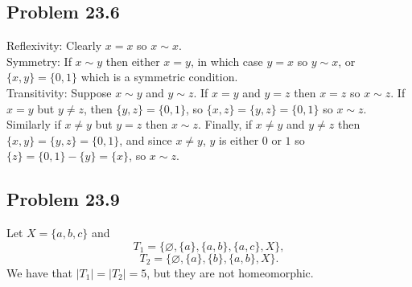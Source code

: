 \documentclass{article}
\newcommand{\nullset}{\varnothing}
\begin{document}
\subsection*{Problem 23.6}
Reflexivity: Clearly $x = x$ so $x \sim x$. \\
Symmetry: If $x \sim y$ then either $x = y$, in which case $y = x$ so $y \sim x$, or $\{x, y\} = \{0, 1\}$ which is a symmetric condition. \\
Transitivity: Suppose $x \sim y$ and $y \sim z$. If $x = y$ and $y = z$ then $x = z$ so $x \sim z$. If $x = y$ but $y \neq z$, then $\{y, z\} = \{0, 1\}$, so $\{x, z\} = \{y, z\} = \{0, 1\}$ so $x \sim z$. Similarly if $x \neq y$ but $y = z$ then $x \sim z$. Finally, if $x \neq y$ and $y \neq z$ then $\{x, y\} = \{y, z\} = \{0, 1\}$, and since $x \neq y$, $y$ is either $0$ or $1$ so $\{z\} = \{0, 1\} - \{y\} = \{x\}$, so $x \sim z$.

\subsection*{Problem 23.9}
Let $X = \{a, b, c\}$ and
$$T_1 = \{\nullset, \{a\}, \{a, b\}, \{a, c\}, X\},$$
$$T_2 = \{\nullset, \{a\}, \{b\}, \{a, b\}, X\}.$$
We have that $|T_1| = |T_2| = 5$, but they are not homeomorphic.
\end{document}
